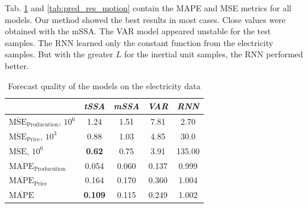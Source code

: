 \documentclass[referee, pdflatex, sn-mathphys-num]{sn-jnl}
\theoremstyle{definition}
\theoremstyle{plain}
\begin{document}
	Tab. \ref{tab:pred_res_electr} and \ref{tab:pred_res_motion} contain the MAPE and MSE metrics for all models. Our method showed the best results in most cases. Close values were obtained with the mSSA. The VAR model appeared unstable for the test samples. The RNN learned only the constant function from the electricity samples. But with the greater $ L $ for the inertial unit samples, the RNN performed better.
	
	\def\arraystretch{1.2}
	\begin{table}[h]
		\centering
		\caption{Forecast quality of the models on the electricity data}\label{tab:pred_res_electr}
		\begin{tabular}{|l|c|c|c|c|}
			\hline
			\diagbox[width=3.3cm]{Metric}{Method} & \textit{tSSA}  & \textit{mSSA} & \textit{VAR} & \textit{RNN} \\ \hline
			$ \overline{\text{MSE}}_{\text{Producution}} $, $10^6$ & 1.24           & 1.51          & 7.81         & 2.70         \\ \hline
			$ \overline{\text{MSE}}_{\text{Price}} $, $10^3$      & 0.88           & 1.03          & 4.85         & 30.0         \\ \hline
			$ \overline{\text{MSE}} $, $10^6$             & \textbf{0.62}  & 0.75          & 3.91         & 135.00       \\ \hline
			$ \overline{\text{MAPE}}_{\text{Producution}} $        & 0.054          & 0.060         & 0.137        & 0.999        \\ \hline
			$ \overline{\text{MAPE}}_{\text{Price}} $             & 0.164          & 0.170         & 0.360        & 1.004        \\ \hline
			$ \overline{\text{MAPE}} $                    & \textbf{0.109} & 0.115         & 0.249        & 1.002        \\ \hline
		\end{tabular}
	\end{table}
	
\end{document}
